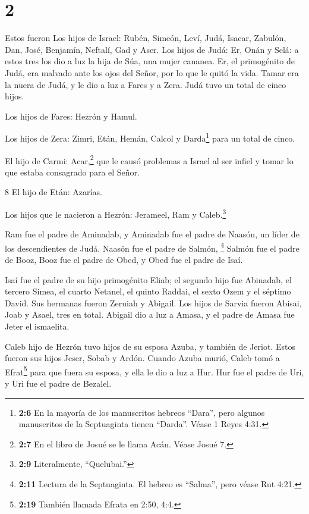 \hypertarget{section-1}{%
\section{2}\label{section-1}}

 Estos fueron Los hijos de Israel: Rubén, Simeón, Leví,
Judá, Isacar, Zabulón,  Dan, José, Benjamín, Neftalí, Gad y
Aser.  Los hijos de Judá: Er, Onán y Selá: a estos tres los
dio a luz la hija de Súa, una mujer cananea. Er, el primogénito de Judá,
era malvado ante los ojos del Señor, por lo que le quitó la vida.
 Tamar era la nuera de Judá, y le dio a luz a Fares y a
Zera. Judá tuvo un total de cinco hijos.

 Los hijos de Fares: Hezrón y Hamul.

 Los hijos de Zera: Zimri, Etán, Hemán, Calcol y
Darda\footnote{\textbf{2:6} En la mayoría de los manuscritos hebreos
  ``Dara'', pero algunos manuscritos de la Septuaginta tienen ``Darda''.
  Véase 1 Reyes 4:31.} para un total de cinco.

 El hijo de Carmi: Acar,\footnote{\textbf{2:7} En el libro
  de Josué se le llama Acán. Véase Josué 7.} que le causó problemas a
Israel al ser infiel y tomar lo que estaba consagrado para el Señor.

8 El hijo de Etán: Azarías.

 Los hijos que le nacieron a Hezrón: Jerameel, Ram y
Caleb.\footnote{\textbf{2:9} Literalmente, ``Quelubai.''}

 Ram fue el padre de Aminadab, y Aminadab fue el padre de
Naasón, un líder de los descendientes de Judá.  Naasón fue
el padre de Salmón, \footnote{\textbf{2:11} Lectura de la Septuaginta.
  El hebreo es ``Salma'', pero véase Rut 4:21.} Salmón fue el padre de
Booz,  Booz fue el padre de Obed, y Obed fue el padre de
Isaí.

 Isaí fue el padre de su hijo primogénito Eliab; el segundo
hijo fue Abinadab, el tercero Simea,  el cuarto Netanel, el
quinto Raddai,  el sexto Ozem y el séptimo David.
 Sus hermanas fueron Zeruiah y Abigail. Los hijos de Sarvia
fueron Abisai, Joab y Asael, tres en total.  Abigail dio a
luz a Amasa, y el padre de Amasa fue Jeter el ismaelita.

 Caleb hijo de Hezrón tuvo hijos de su esposa Azuba, y
también de Jeriot. Estos fueron sus hijos Jeser, Sobab y Ardón.
 Cuando Azuba murió, Caleb tomó a Efrat\footnote{\textbf{2:19}
  También llamada Efrata en 2:50, 4:4.} para que fuera su esposa, y ella
le dio a luz a Hur.  Hur fue el padre de Uri, y Uri fue el
padre de Bezalel.

